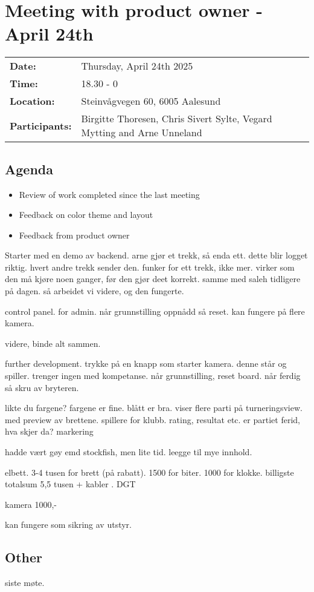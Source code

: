 \section{Meeting with product owner - April 24th}
\begin{tabular}{ll}
    \textbf{Date:} & Thursday, April 24th 2025 \\
    \textbf{Time:} & 18.30 - 0\\
    \textbf{Location:} & Steinvågvegen 60, 6005 Aalesund \\
    \textbf{Participants:} & Birgitte Thoresen, Chris Sivert Sylte, Vegard Mytting and Arne Unneland\\
\end{tabular}

\vspace{0.5cm}

\subsection{Agenda}

\begin{itemize} 
    \item Review of work completed since the last meeting
    \item Feedback on color theme and layout
    \item Feedback from product owner 
\end{itemize}

Starter med en demo av backend. arne gjør et trekk, så enda ett. dette blir logget riktig. hvert andre trekk sender den. funker for ett trekk, ikke mer. virker som den må kjøre noen ganger, før den gjør deet korrekt. samme med saleh tidligere på dagen. så arbeidet vi videre, og den fungerte. 

control panel. for admin. når grunnstilling oppnådd så reset. kan fungere på flere kamera.


videre, binde alt sammen. 

further development. trykke på en knapp som starter kamera. denne står og spiller. trenger ingen med kompetanse. når grunnstilling, reset board. når ferdig så skru av bryteren. 

likte du fargene? fargene er fine. blått er bra. viser flere parti på turneringsview. med preview av brettene. spillere for klubb. rating, resultat etc. er partiet ferid, hva skjer da? markering

hadde vært gøy emd stockfish, men lite tid. leegge  til mye innhold. 


elbett. 3-4 tusen for brett (på rabatt). 1500 for biter. 1000 for klokke. billigste totalsum 5,5 tusen + kabler . DGT

kamera 1000,- 

kan fungere som sikring av utstyr. 

\subsection{Other} 
siste møte. 